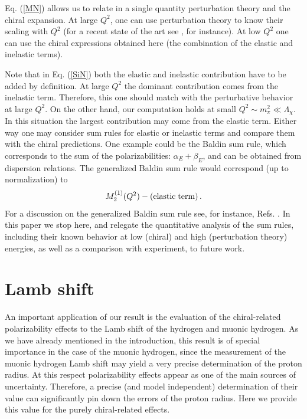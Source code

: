 \documentclass[a4paper,12pt]{article}
\newcommand{\be}{\begin{equation}}
\newcommand{\ee}{\end{equation}}
\begin{document}
Eq. (\ref{MN}) allows us to relate in a single quantity perturbation theory and the chiral 
expansion. At large $Q^2$, one can use perturbation theory to know their scaling 
with $Q^2$ (for a recent state of the art see \cite{Vermaseren:2005qc}, for instance). 
At low $Q^2$ one can use the chiral expressions obtained here (the combination of the 
elastic and inelastic terms). 

Note that in Eq. (\ref{SiN}) both the elastic and inelastic contribution have 
to be added by definition. At large $Q^2$ the dominant contribution comes from the 
inelastic term. Therefore, this one should match with the perturbative behavior at 
large $Q^2$. On the other hand, our computation holds at small $Q^2 \sim m_{\pi}^2 \ll \Lambda_{\chi}$. 
In this situation the largest contribution may come from the elastic term. 
Either way one may consider sum rules for elastic or inelastic terms and 
compare them with the chiral predictions. One example could be the Baldin sum rule, 
which corresponds to the sum of the polarizabilities: 
$\alpha_E+\beta_E$, and can be obtained from dispersion relations. 
The generalized Baldin sum rule would correspond (up to normalization) to 
\be
M_2^{(1)}(Q^2)-({\rm elastic \; term})
\,.
\ee
For a discussion on the generalized Baldin sum rule see, for 
instance, Refs. \cite{Drechsel:2002ar,Liang:2004tk}. In this paper we stop here, 
and relegate the quantitative analysis of the sum rules, including their known behavior 
at low (chiral) and high (perturbation theory) energies, as well as a 
comparison with experiment, to future work. 

\section{Lamb shift}

An important application of our result is the evaluation of the chiral-related 
polarizability effects to the Lamb shift of the hydrogen and muonic hydrogen. 
As we have already mentioned in the introduction, 
this result is of special importance in the case of the muonic hydrogen, since
the measurement of the muonic hydrogen Lamb shift may yield a very precise 
determination of the proton radius. At this respect polarizability effects appear 
as one of the main sources of uncertainty. Therefore, a precise (and model independent)
determination of their value can significantly pin down the errors of the proton radius. 
Here we provide this value for the purely chiral-related effects. 
\end{document}
